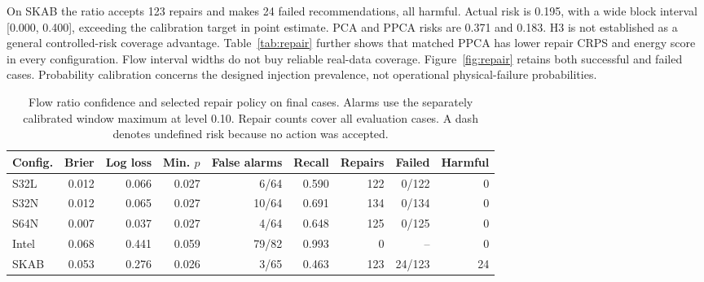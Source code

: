 \documentclass[conference]{IEEEtran}
\newcommand{\1}{\mathbf{1}}
\begin{document}
On SKAB the ratio accepts 123 repairs and makes 24 failed recommendations, all harmful. Actual risk is 0.195, with a wide block interval [0.000, 0.400], exceeding the calibration target in point estimate. PCA and PPCA risks are 0.371 and 0.183. H3 is not established as a general controlled-risk coverage advantage. Table~\ref{tab:repair} further shows that matched PPCA has lower repair CRPS and energy score in every configuration. Flow interval widths do not buy reliable real-data coverage. Figure~\ref{fig:repair} retains both successful and failed cases. Probability calibration concerns the designed injection prevalence, not operational physical-failure probabilities.
\begin{table}[t]
\centering
\caption{Flow ratio confidence and selected repair policy on final cases. Alarms use the separately calibrated window maximum at level 0.10. Repair counts cover all evaluation cases. A dash denotes undefined risk because no action was accepted.}
\label{tab:confidence}
\small
\begin{tabular}{lrrrrrrrr}
\toprule
Config. & Brier & Log loss & Min. $p$ & False alarms & Recall & Repairs & Failed & Harmful \\
\midrule
S32L & 0.012 & 0.066 & 0.027 & 6/64 & 0.590 & 122 & 0/122 & 0 \\
S32N & 0.012 & 0.065 & 0.027 & 10/64 & 0.691 & 134 & 0/134 & 0 \\
S64N & 0.007 & 0.037 & 0.027 & 4/64 & 0.648 & 125 & 0/125 & 0 \\
Intel & 0.068 & 0.441 & 0.059 & 79/82 & 0.993 & 0 & -- & 0 \\
SKAB & 0.053 & 0.276 & 0.026 & 3/65 & 0.463 & 123 & 24/123 & 24 \\
\bottomrule
\end{tabular}
\end{table}
\end{document}
